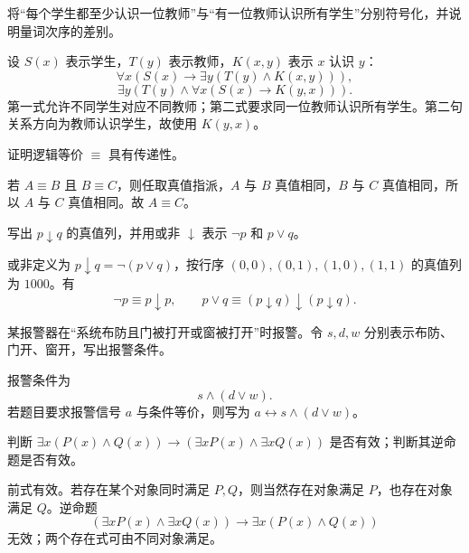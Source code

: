 \begin{exercise}[level=standard]
将“每个学生都至少认识一位教师”与“有一位教师认识所有学生”分别符号化，并说明量词次序的差别。
\begin{solution}
设 $S(x)$ 表示学生，$T(y)$ 表示教师，$K(x,y)$ 表示 $x$ 认识 $y$：
\[
\forall x(S(x)\to\exists y(T(y)\land K(x,y))),
\]
\[
\exists y(T(y)\land\forall x(S(x)\to K(y,x))).
\]
第一式允许不同学生对应不同教师；第二式要求同一位教师认识所有学生。第二句关系方向为教师认识学生，故使用 $K(y,x)$。
\end{solution}
\end{exercise}

\begin{exercise}[level=standard]
证明逻辑等价 $\equiv$ 具有传递性。
\begin{solution}
若 $A\equiv B$ 且 $B\equiv C$，则任取真值指派，$A$ 与 $B$ 真值相同，$B$ 与 $C$ 真值相同，所以 $A$ 与 $C$ 真值相同。故 $A\equiv C$。
\end{solution}
\end{exercise}

\begin{exercise}[level=standard]
写出 $p\downarrow q$ 的真值列，并用或非 $\downarrow$ 表示 $\neg p$ 和 $p\lor q$。
\begin{solution}
或非定义为 $p\downarrow q=\neg(p\lor q)$，按行序 $(0,0),(0,1),(1,0),(1,1)$ 的真值列为 $1000$。有
\[
\neg p\equiv p\downarrow p,\qquad
p\lor q\equiv(p\downarrow q)\downarrow(p\downarrow q).
\]
\end{solution}
\end{exercise}

\begin{exercise}[level=standard]
某报警器在“系统布防且门被打开或窗被打开”时报警。令 $s,d,w$ 分别表示布防、门开、窗开，写出报警条件。
\begin{solution}
报警条件为
\[
s\land(d\lor w).
\]
若题目要求报警信号 $a$ 与条件等价，则写为 $a\leftrightarrow s\land(d\lor w)$。
\end{solution}
\end{exercise}

\begin{exercise}[level=advanced]
判断 $\exists x(P(x)\land Q(x))\to(\exists xP(x)\land\exists xQ(x))$ 是否有效；判断其逆命题是否有效。
\begin{solution}
前式有效。若存在某个对象同时满足 $P,Q$，则当然存在对象满足 $P$，也存在对象满足 $Q$。逆命题
\[
(\exists xP(x)\land\exists xQ(x))\to\exists x(P(x)\land Q(x))
\]
无效；两个存在式可由不同对象满足。
\end{solution}
\end{exercise}

